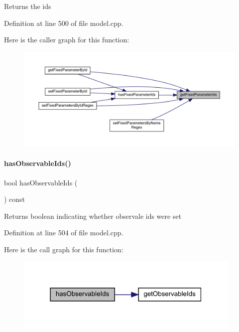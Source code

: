 \begin{DoxyReturn}{Returns}
the ids 
\end{DoxyReturn}


Definition at line 500 of file model.\+cpp.

Here is the caller graph for this function\+:
\nopagebreak
\begin{figure}[H]
\begin{center}
\leavevmode
\includegraphics[width=350pt]{classamici_1_1_model_aa9278a175bc86b5b020df35dd2581734_icgraph}
\end{center}
\end{figure}
\mbox{\label{classamici_1_1_model_a328bd98abbf8d7ccb8f6cebbc76e5b61}} 
\paragraph{\texorpdfstring{hasObservableIds()}{hasObservableIds()}}
{\footnotesize\ttfamily bool has\+Observable\+Ids (\begin{DoxyParamCaption}{ }\end{DoxyParamCaption}) const\hspace{0.3cm}{\ttfamily [virtual]}}

\begin{DoxyReturn}{Returns}
boolean indicating whether observale ids were set 
\end{DoxyReturn}


Definition at line 504 of file model.\+cpp.

Here is the call graph for this function\+:
\nopagebreak
\begin{figure}[H]
\begin{center}
\leavevmode
\includegraphics[width=307pt]{classamici_1_1_model_a328bd98abbf8d7ccb8f6cebbc76e5b61_cgraph}
\end{center}
\end{figure}
\mbox{\label{classamici_1_1_model_a8d356757af0856dbdb6c45548f788377}} 

